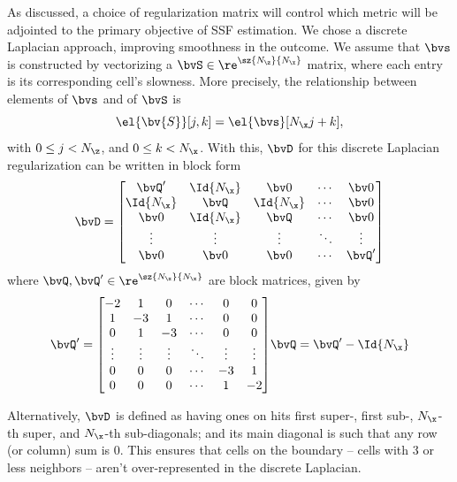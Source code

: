 As discussed, a choice of regularization matrix will control which metric will be adjointed to the primary objective of SSF estimation. We chose a discrete Laplacian approach, improving smoothness in the outcome. We assume that $\bvs$ is constructed by vectorizing a $\bvS \in \re^{\sz{N_{\z}}{N_{\x}}}$ matrix, where each entry is its corresponding cell's slowness. More precisely, the relationship between elements of $\bvs$ and of $\bvS$ is
\begin{equation}
	\el{\bv{S}}[j,k] = \el{\bvs}[N_{\x}j+k],
\end{equation}
with $0 \leq j < N_{\z}$, and $0 \leq k < N_{\x}$. With this, $\bvD$ for this discrete Laplacian regularization can be written in block form
\begin{equation}
	\bvD = \begin{bmatrix}
		\bvQ' & \Id{N_{\x}} & \bv0  & \cdots & \bv0\\
		\Id{N_{\x}} & \bvQ & \Id{N_{\x}} & \cdots & \bv0\\
		\bv0 & \Id{N_{\x}} & \bvQ & \cdots & \bv0\\
		\vdots & \vdots & \vdots & \ddots & \vdots \\
		\bv0 & \bv0 & \bv0 & \cdots & \bvQ'
	\end{bmatrix}
\end{equation}
where $\bvQ,\bvQ' \in \re^{\sz{N_{\x}}{N_{\x}}}$ are block matrices, given by
\begin{subequations}
	\begin{gather}
		\bvQ' = \begin{bmatrix}
			-2 & 1 & 0 & \cdots & 0 & 0 \\
			1 & -3 & 1 & \cdots & 0 & 0 \\
			0 & 1 & -3 & \cdots & 0 & 0 \\
			\vdots & \vdots & \vdots & \ddots & \vdots & \vdots \\
			0 & 0 & 0 & \cdots & -3 & 1 \\
			0 & 0 & 0 & \cdots & 1  & -2
		\end{bmatrix}
	\end{gather}
	\begin{gather}
		\bvQ = \bvQ' - \Id{N_{\x}}
	\end{gather}
\end{subequations}

Alternatively, $\bvD$ is defined as having ones on hits first {super-,} first sub-, $N_{\x}$-th super, and $N_{\x}$-th sub-diagonals; and its main diagonal is such that any row (or column) sum is $0$. This ensures that cells on the boundary -- cells with 3 or less neighbors -- aren't over-represented in the discrete Laplacian.

